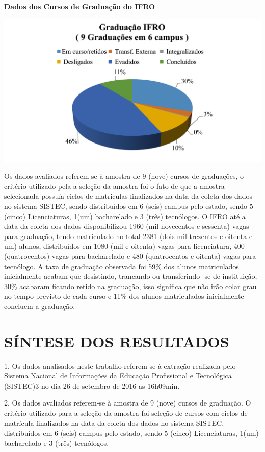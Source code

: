 \documentclass[article,12pt,onesidea,4paper,english,brazil]{abntex2}
\begin{document}
	\textbf{Dados dos Cursos de Graduação do IFRO}
	\begin{center}
		\includegraphics[width=0.7\linewidth]{pip-97-15}
	\end{center}
	
	Os dados avaliados referem-se à amostra de 9 (nove) cursos de graduações, o critério
	utilizado pela a seleção da amostra foi o fato de que a amostra selecionada possuía ciclos de
	matriculas finalizados na data da coleta dos dados no sistema SISTEC, sendo distribuídos em 6
	(seis) campus pelo estado, sendo 5 (cinco) Licenciaturas, 1(um) bacharelado e 3 (três) tecnólogos.
	O IFRO até a data da coleta dos dados disponibilizou 1960 (mil novecentos e sessenta) vagas para
	graduação, tendo matriculado no total 2381 (dois mil trezentos e oitenta e um) alunos,
	distribuídos em 1080 (mil e oitenta) vagas para licenciatura, 400 (quatrocentos) vagas para
	bacharelado e 480 (quatrocentos e oitenta) vagas para tecnólogo. A taxa de graduação observada
	foi 59\% dos alunos matriculados inicialmente acabam que desistindo, trancando ou transferindo-
	se de instituição, 30\% acabaram ficando retido na graduação, isso significa que não irão colar
	grau no tempo previsto de cada curso e 11\% dos alunos matriculados inicialmente concluem a
	graduação.
	
	\section*{SÍNTESE DOS RESULTADOS}
	
	1. Os dados analisados neste trabalho referem-se à extração realizada pelo Sistema Nacional
	de Informações da Educação Profissional e Tecnológica (SISTEC)3 no dia 26 de setembro de 2016 as 16h09min.
	
	2. Os dados avaliados referem-se à amostra de 9 (nove) cursos de graduação. O critério
	utilizado para a seleção da amostra foi seleção de cursos com ciclos de matrícula
	finalizados na data da coleta dos dados no sistema SISTEC, distribuídos em 6 (seis)
	campus pelo estado, sendo 5 (cinco) Licenciaturas, 1(um) bacharelado e 3 (três)
	tecnólogos.
	
\end{document}
